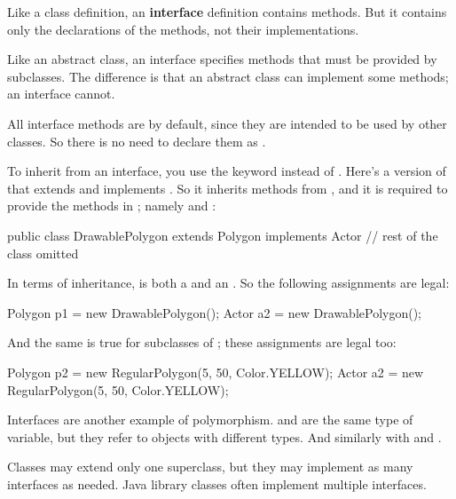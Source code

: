 
Like a class definition, an {\bf interface} definition contains methods.
But it contains only the declarations of the methods, not their implementations.

Like an abstract class, an interface specifies methods that must be provided by subclasses.
The difference is that an abstract class can implement some methods; an interface cannot.

All interface methods are  by default, since they are intended to be used by other classes.
So there is no need to declare them as .

To inherit from an interface, you use the keyword  instead of .
Here's a version of  that extends  and implements .
So it inherits methods from , and it is required to provide the methods in ; namely  and :

\begin{code}
public class DrawablePolygon extends Polygon implements Actor {
    // rest of the class omitted
}
\end{code}

In terms of inheritance,  is both a  and an .
So the following assignments are legal:

\begin{code}
Polygon p1 = new DrawablePolygon();
Actor a2 = new DrawablePolygon();
\end{code}

And the same is true for subclasses of ; these assignments are legal too:

\begin{code}
Polygon p2 = new RegularPolygon(5, 50, Color.YELLOW);
Actor a2 = new RegularPolygon(5, 50, Color.YELLOW);
\end{code}


Interfaces are another example of polymorphism.
 and  are the same type of variable, but they refer to objects with different types.
And similarly with  and .


Classes may extend only one superclass, but they may implement as many interfaces as needed.
Java library classes often implement multiple interfaces.


